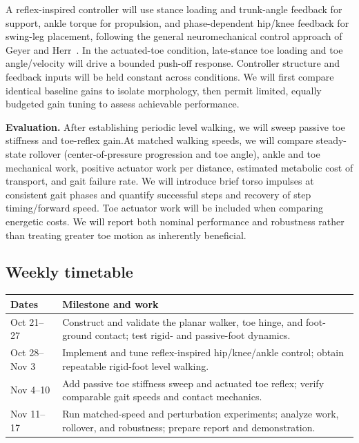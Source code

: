 \documentclass[11pt,letterpaper]{article}
\begin{document}
A reflex-inspired controller will use stance loading and trunk-angle feedback for support, ankle torque for propulsion, and phase-dependent hip/knee feedback for swing-leg placement, following the general neuromechanical control approach of Geyer and Herr~\cite{geyer2010}. In the actuated-toe condition, late-stance toe loading and toe angle/velocity will drive a bounded push-off response. Controller structure and feedback inputs will be held constant across conditions. We will first compare identical baseline gains to isolate morphology, then permit limited, equally budgeted gain tuning to assess achievable performance.

\textbf{Evaluation.} After establishing periodic level walking, we will sweep passive toe stiffness and toe-reflex gain.At matched walking speeds, we will compare steady-state rollover
(center-of-pressure progression and toe angle), ankle and toe
mechanical work, positive actuator work per distance, estimated
metabolic cost of transport, and gait failure rate. We will introduce brief torso impulses at consistent gait phases and quantify successful steps and recovery of step timing/forward speed. Toe actuator work will be included when comparing energetic costs. We will report both nominal performance and robustness rather than treating greater toe motion as inherently beneficial.

\subsection*{Weekly timetable}
\vspace{-0.65em}
\renewcommand{\arraystretch}{1.10}
\begin{tabularx}{\linewidth}{@{}>{\raggedright\arraybackslash}p{1.05in}X@{}}
\toprule
\textbf{Dates} & \textbf{Milestone and work}\\
\midrule
Oct 21--27 & Construct and validate the planar walker, toe hinge, and foot-ground contact; test rigid- and passive-foot dynamics.\\
Oct 28--Nov 3 & Implement and tune reflex-inspired hip/knee/ankle control; obtain repeatable rigid-foot level walking.\\
Nov 4--10 & Add passive toe stiffness sweep and actuated toe reflex; verify comparable gait speeds and contact mechanics.\\
Nov 11--17 & Run matched-speed and perturbation experiments; analyze work, rollover, and robustness; prepare report and demonstration.\\
\bottomrule
\end{tabularx}
\vspace{0.3em}
\end{document}
